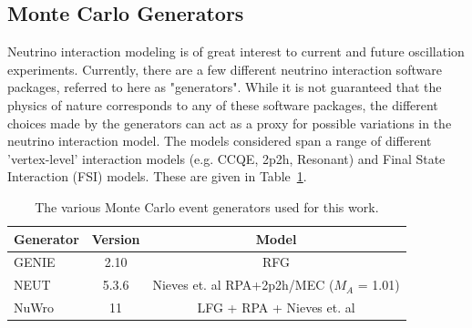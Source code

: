 \documentclass[12pt]{article}
\begin{document}
\subsection{Monte Carlo Generators}
\label{subsec:gen}
Neutrino interaction modeling is of great interest to current and future oscillation experiments. Currently, there are a few different neutrino interaction software packages, referred to here as "generators". While it is not guaranteed that the physics of nature corresponds to any of these software packages, the different choices made by the generators can act as a proxy for possible variations in the neutrino interaction model. The models considered span a range of different 'vertex-level' interaction models (e.g. CCQE, 2p2h, Resonant) and Final State Interaction (FSI) models. These are given in Table~\ref{tab:gens}.



\begin{table}
\centering
 \begin{tabular}{| l  c  c |} 
 \hline
 Generator & Version & Model\\ [0.5ex] 
 \hline
 GENIE\cite{GENIE} & 2.10 & RFG \\ 
 NEUT\cite{NEUT} & 5.3.6 & Nieves et. al RPA+2p2h/MEC ($M_A$ = 1.01) \\
 NuWro\cite{NUWRO} & 11 & LFG + RPA + Nieves et. al \\[1ex]
 \hline
\end{tabular}
\caption{The various Monte Carlo event generators used for this work.}
\label{tab:gens}
\end{table}

\end{document}
